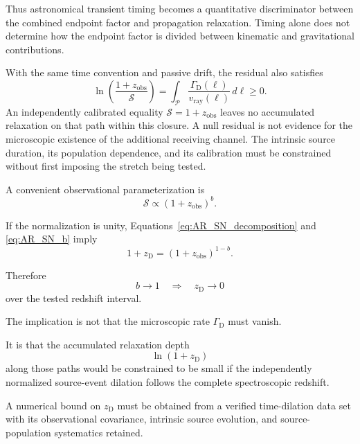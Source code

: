 Thus astronomical transient timing becomes a quantitative discriminator
between the combined endpoint factor and propagation relaxation. Timing alone
does not determine how the endpoint factor is divided between kinematic and
gravitational contributions.

With the same time convention and passive drift, the residual also satisfies
\[
    \ln\!\left(\frac{1+z_{\mathrm{obs}}}{\mathcal S}\right)
    =\int_{\mathcal P}
      \frac{\Gamma_{\mathrm D}(\ell)}{v_{\mathrm{ray}}(\ell)}\,d\ell
    \geq0.
\]
An independently calibrated equality
\(\mathcal S=1+z_{\mathrm{obs}}\) leaves no accumulated relaxation on that
path within this closure. A null residual is not evidence for the microscopic
existence of the additional receiving channel. The intrinsic source duration,
its population dependence, and its calibration must be constrained without
first imposing the stretch being tested.

A convenient observational parameterization is
\begin{equation}
    \mathcal S
    \propto
    (1+z_{\mathrm{obs}})^b.
    \label{eq:AR_SN_b}
\end{equation}

If the normalization is unity, Equations~\eqref{eq:AR_SN_decomposition} and
\eqref{eq:AR_SN_b} imply
\begin{equation}
    \boxed{
    1+z_{\mathrm D}
    =
    (1+z_{\mathrm{obs}})^{1-b}.
    }
    \label{eq:AR_SN_zD_b}
\end{equation}

Therefore
\begin{equation}
    b\rightarrow1
    \quad\Longrightarrow\quad
    z_{\mathrm D}\rightarrow0
\end{equation}
over the tested redshift interval.

The implication is not that the microscopic rate
\(\Gamma_{\mathrm D}\) must vanish.

It is that the accumulated relaxation depth
\begin{equation}
    \ln(1+z_{\mathrm D})
\end{equation}
along those paths would be constrained to be small if the independently
normalized source-event dilation follows the complete spectroscopic redshift.

A numerical bound on \(z_{\mathrm D}\) must be obtained from a verified
time-dilation data set with its observational covariance, intrinsic source
evolution, and source-population systematics retained.

